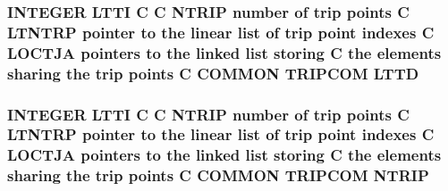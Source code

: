 \hypertarget{home_2abonfi_2_c_f_d__codes_2_eul_f_s_83_84_2include_2trip_8com_a0d4fc998108c0f869ce087a3b54bdca6}{
\subsubsection[{L\-T\-T\-D}]{\setlength{\rightskip}{0pt plus 5cm}I\-N\-T\-E\-G\-E\-R L\-T\-T\-I C C {\bf N\-T\-R\-I\-P} number of trip points C L\-T\-N\-T\-R\-P pointer to the linear list of trip point indexes C {\bf L\-O\-C\-T\-J\-A} pointers to the linked list storing C the elements sharing the trip points C C\-O\-M\-M\-O\-N T\-R\-I\-P\-C\-O\-M L\-T\-T\-D}}\label{home_2abonfi_2_c_f_d__codes_2_eul_f_s_83_84_2include_2trip_8com_a0d4fc998108c0f869ce087a3b54bdca6}
\hypertarget{home_2abonfi_2_c_f_d__codes_2_eul_f_s_83_84_2include_2trip_8com_a3d7b914361a6e11bdeb7e6b866517781}{
\subsubsection[{N\-T\-R\-I\-P}]{\setlength{\rightskip}{0pt plus 5cm}I\-N\-T\-E\-G\-E\-R L\-T\-T\-I C C N\-T\-R\-I\-P number of trip points C L\-T\-N\-T\-R\-P pointer to the linear list of trip point indexes C {\bf L\-O\-C\-T\-J\-A} pointers to the linked list storing C the elements sharing the trip points C C\-O\-M\-M\-O\-N T\-R\-I\-P\-C\-O\-M N\-T\-R\-I\-P}}\label{home_2abonfi_2_c_f_d__codes_2_eul_f_s_83_84_2include_2trip_8com_a3d7b914361a6e11bdeb7e6b866517781}
